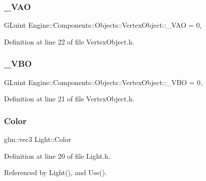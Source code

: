 \mbox{\label{classEngine_1_1Components_1_1Objects_1_1VertexObject_ae85ac9d5ded8f54d58feb7fb78e75130}} 
\subsubsection{\texorpdfstring{\+\_\+\+V\+AO}{\_VAO}}
{\footnotesize\ttfamily G\+Luint Engine\+::\+Components\+::\+Objects\+::\+Vertex\+Object\+::\+\_\+\+V\+AO = 0\hspace{0.3cm}{\ttfamily [protected]}, {\ttfamily [inherited]}}



Definition at line 22 of file Vertex\+Object.\+h.

\mbox{\label{classEngine_1_1Components_1_1Objects_1_1VertexObject_a79e171ffe4b9342d76c0c729a9836fd2}} 
\subsubsection{\texorpdfstring{\+\_\+\+V\+BO}{\_VBO}}
{\footnotesize\ttfamily G\+Luint Engine\+::\+Components\+::\+Objects\+::\+Vertex\+Object\+::\+\_\+\+V\+BO = 0\hspace{0.3cm}{\ttfamily [protected]}, {\ttfamily [inherited]}}



Definition at line 21 of file Vertex\+Object.\+h.

\mbox{\label{classLight_ae5e1e9cb633cea9ad892e644354bd6d1}} 
\subsubsection{\texorpdfstring{Color}{Color}}
{\footnotesize\ttfamily glm\+::vec3 Light\+::\+Color}



Definition at line 20 of file Light.\+h.



Referenced by Light(), and Use().

\mbox{\label{classEngine_1_1Components_1_1Objects_1_1VertexObject_ae5bb104a878dc8a3c909ec9b0ee799c1}} 
